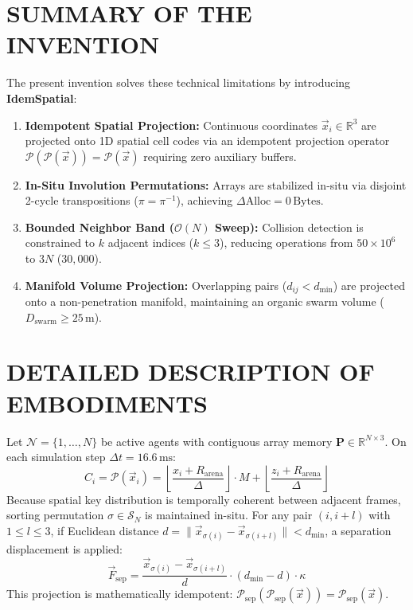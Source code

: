 \documentclass[11pt,a4paper]{article}
\begin{document}
\section*{SUMMARY OF THE INVENTION}
The present invention solves these technical limitations by introducing \textbf{IdemSpatial}:
\begin{enumerate}
    \item \textbf{Idempotent Spatial Projection:} Continuous coordinates $\vec{x}_i \in \mathbb{R}^3$ are projected onto 1D spatial cell codes via an idempotent projection operator $\mathcal{P}(\mathcal{P}(\vec{x})) = \mathcal{P}(\vec{x})$ requiring zero auxiliary buffers.
    \item \textbf{In-Situ Involution Permutations:} Arrays are stabilized in-situ via disjoint 2-cycle transpositions ($\pi = \pi^{-1}$), achieving $\Delta\text{Alloc} = 0\,\text{Bytes}$.
    \item \textbf{Bounded Neighbor Band ($\mathcal{O}(N)$ Sweep):} Collision detection is constrained to $k$ adjacent indices ($k \le 3$), reducing operations from $50 \times 10^6$ to $3N$ ($30,000$).
    \item \textbf{Manifold Volume Projection:} Overlapping pairs ($d_{ij} < d_{\min}$) are projected onto a non-penetration manifold, maintaining an organic swarm volume ($D_{\text{swarm}} \ge 25\,\text{m}$).
\end{enumerate}

\section*{DETAILED DESCRIPTION OF EMBODIMENTS}
Let $\mathcal{N} = \{1, \dots, N\}$ be active agents with contiguous array memory $\mathbf{P} \in \mathbb{R}^{N \times 3}$. On each simulation step $\Delta t = 16.6\,\text{ms}$:
\begin{equation}
C_i = \mathcal{P}(\vec{x}_i) = \left\lfloor \frac{x_i + R_{\text{arena}}}{\Delta} \right\rfloor \cdot M + \left\lfloor \frac{z_i + R_{\text{arena}}}{\Delta} \right\rfloor
\end{equation}
Because spatial key distribution is temporally coherent between adjacent frames, sorting permutation $\sigma \in \mathcal{S}_N$ is maintained in-situ. For any pair $(i, i+l)$ with $1 \le l \le 3$, if Euclidean distance $d = \|\vec{x}_{\sigma(i)} - \vec{x}_{\sigma(i+l)}\| < d_{\min}$, a separation displacement is applied:
\begin{equation}
\vec{F}_{\text{sep}} = \frac{\vec{x}_{\sigma(i)} - \vec{x}_{\sigma(i+l)}}{d} \cdot (d_{\min} - d) \cdot \kappa
\end{equation}
This projection is mathematically idempotent: $\mathcal{P}_{\text{sep}}(\mathcal{P}_{\text{sep}}(\vec{x})) = \mathcal{P}_{\text{sep}}(\vec{x})$.
\end{document}

